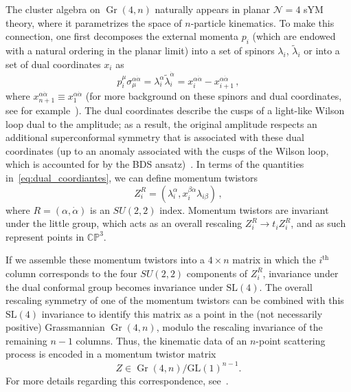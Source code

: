 \documentclass[12pt]{article}
\DeclareMathOperator{\Gr}{Gr}
\begin{document}
The cluster algebra on $\Gr(4,n)$ naturally appears in planar $\mathcal{N}=4$ sYM theory, where it parametrizes the space of $n$-particle kinematics. To make this connection, one first decomposes the external momenta $p_i$ (which are endowed with a natural ordering in the planar limit) into a set of spinors $\lambda_i$, $\tilde \lambda_i$ or into a set of dual coordinates $x_i$ as
\begin{equation}
p^\mu_i \sigma_\mu^{\alpha \dot \alpha} = \lambda_i^\alpha \tilde \lambda_i^{\dot \alpha} = x_i^{\alpha \dot \alpha} - x_{i+1}^{\alpha \dot \alpha} \, , \label{eq:dual_coordiantes}
\end{equation}
where $x_{n+1}^{\alpha \dot \alpha} \equiv x_1^{\alpha \dot \alpha}$ (for more background on these spinors and dual coordinates, see for example~\cite{Dixon:2013uaa,Elvang:2013cua}). The dual coordinates describe the cusps of a light-like Wilson loop dual to the amplitude; as a result, the original amplitude respects an additional superconformal symmetry that is associated with these dual coordinates (up to an anomaly associated with the cusps of the Wilson loop, which is accounted for by the BDS ansatz)~\cite{Bern:2005iz,Drummond:2007au,Bern:2008ap,Drummond:2008aq,Drummond:2006rz,Bern:2006ew,Bern:2007ct,Alday:2007hr,Drummond:2008vq}. In terms of the quantities in~\eqref{eq:dual_coordiantes}, we can define momentum twistors 
\begin{equation}
Z^R_i = (\lambda_i^\alpha, x_i^{\beta \dot \alpha} \lambda_{i \beta}) \, ,
\end{equation}
where $R = (\alpha, \dot \alpha)$ is an $SU(2,2)$ index. Momentum twistors are invariant under the little group, which acts as an overall rescaling $Z_i^R \rightarrow  t_i Z_i^R$, and as such represent points in $\mathbb{CP}^3$. 

If we assemble these momentum twistors into a $4 \times n$ matrix in which the $i^\text{th}$ column corresponds to the four $SU(2,2)$ components of $Z_i^R$, invariance under the dual conformal group becomes invariance under $\text{SL}(4)$. The overall rescaling symmetry of one of the momentum twistors can be combined with this $\text{SL}(4)$ invariance to identify this matrix as a point in the (not necessarily positive) Grassmannian $\Gr(4,n)$, modulo the rescaling invariance of the remaining $n-1$ columns. Thus, the kinematic data of an $n$-point scattering process is encoded in a momentum twistor matrix
\begin{equation}
Z \in \Gr(4,n)/\text{GL}(1)^{n-1}. \label{eq:gr4n_momentum_twistor}
\end{equation}
For more details regarding this correspondence, see~\cite{ArkaniHamed:2012nw,Golden:2013xva}. 
\end{document}
